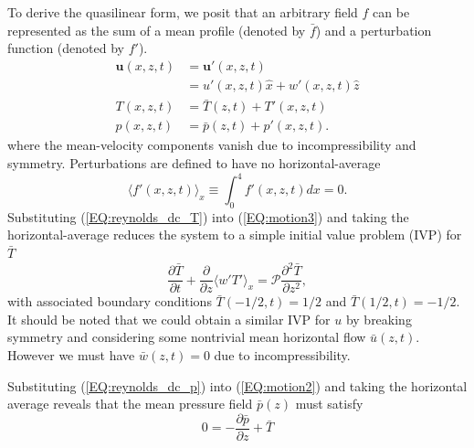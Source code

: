 \documentclass[reprint,amsmath,amssymb,aps]{revtex4-1}
\renewcommand{\vec}[1]{\boldsymbol{#1}}
\newcommand{\eq}[1]{(\ref{#1})}
\begin{document}
To derive the quasilinear form, we posit that an arbitrary field $f$ can be represented as the sum of a mean profile (denoted by $\bar{f}$) and a perturbation function (denoted by $f'$).
\begin{align}
    \vec{u}(x, z, t) &= \vec{u'}(x, z, t) \label{EQ:reynolds_dc_u}\\
    &= u'(x, z, t)\hat{x} + w'(x, z, t)\hat{z} \\
    T(x, z, t) &= \bar{T}(z, t) + T'(x, z, t) \label{EQ:reynolds_dc_T}\\
    p(x, z, t) &= \bar{p}(z, t) +  p'(x, z, t) \label{EQ:reynolds_dc_p}.
\end{align}
where the mean-velocity components vanish due to incompressibility and symmetry. Perturbations are defined to have no horizontal-average
\begin{equation}
    \langle f'(x, z, t) \rangle_x \equiv \int_{0}^4 f'(x, z, t) dx = 0.
\end{equation}
Substituting \eq{EQ:reynolds_dc_T} into \eq{EQ:motion3} and taking the horizontal-average reduces the system to a simple initial value problem (IVP) for $\bar{T}$
\begin{equation}
  \frac{\partial \bar{T}}{\partial t} + \frac{\partial}{\partial z} \langle w'T' \rangle_x = \mathcal{P} \frac{\partial^2 \bar{T}}{\partial z^2}, \label{EQ:T0_IVP}
\end{equation}
with associated boundary conditions $\bar{T}(-1/2, t) = 1/2$ and $\bar{T}(1/2, t) = -1/2$. It should be noted that we could obtain a similar IVP for $u$ by breaking symmetry and considering some nontrivial mean horizontal flow $\bar{u}(z, t)$. However we must have $\bar{w}(z, t) = 0$ due to incompressibility.

Substituting \eq{EQ:reynolds_dc_p} into \eq{EQ:motion2} and taking the horizontal average reveals that the mean pressure field $\bar{p}(z)$ must satisfy
\begin{equation}
    0 = -\frac{\partial \bar{p}}{\partial z} + \bar{T}\label{EQ:p_bar}
\end{equation}
\end{document}
